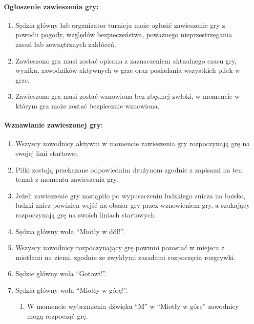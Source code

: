 \documentclass[12pt]{article}
\begin{document}
\paragraph{Ogłoszenie zawieszenia gry:}

\begin{enumerate}
	\item
	      Sędzia główny lub organizator turnieju może ogłosić zawieszenie gry z
	      powodu pogody, względów bezpieczeństwa, poważnego nieprzestrzegania
	      zasad lub zewnętrznych zakłóceń.
	\item
	      Zawieszona gra musi zostać opisana z zaznaczeniem aktualnego czasu
	      gry, wyniku, zawodników aktywnych w grze oraz posiadania wszystkich
	      piłek w grze.
	\item
	      Zawieszona gra musi zostać wznowiona bez zbędnej zwłoki, w momencie w
	      którym gra może zostać bezpiecznie wznowiona.
\end{enumerate}

\paragraph{Wznawianie zawieszonej gry:}

\begin{enumerate}
	\item
	      Wszyscy zawodnicy aktywni w momencie zawieszenia gry rozpoczynają grę
	      na swojej linii startowej.
	\item
	      Piłki zostają przekazane odpowiednim drużynom zgodnie z zapisami na
	      ten temat z momentu zawieszenia gry.
	\item
	      Jeżeli zawieszenie gry nastąpiło po wypuszczeniu ludzkiego znicza na
	      boisko, ludzki znicz powinien wejść na obszar gry przez wznowieniem
	      gry, a szukający rozpoczynają grę na swoich liniach startowych.
	\item
	      Sędzia główny woła ``Miotły w dół!''.
	\item
	      Wszyscy zawodnicy rozpoczynający grę powinni pozostać w miejscu z
	      miotłami na ziemi, zgodnie ze zwykłymi zasadami rozpoczęcia rozgrywki.
	\item
	      Sędzie główny woła ``Gotowi!''.
	\item
	      Sędzia główny woła ``Miotły w górę!''.

	      \begin{enumerate}
		      \item
		            W momencie wybrzmienia dźwięku ``M'' w ``Miotły w górę'' zawodnicy
		            mogą rozpocząć grę.
	      \end{enumerate}
\end{enumerate}
\end{document}
